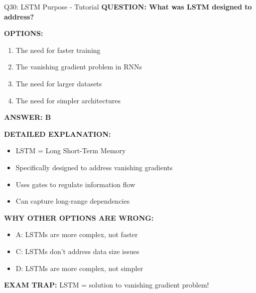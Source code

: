 \documentclass[8pt]{beamer}
\begin{document}
	\begin{frame}{Q30: LSTM Purpose - Tutorial}
		\fontsize{6.5}{7.5}\selectfont
		\textbf{QUESTION: What was LSTM designed to address?}
		
		\vspace{0.1cm}
		\textbf{OPTIONS:}
		\begin{enumerate}
			\item The need for faster training
			\item The vanishing gradient problem in RNNs
			\item The need for larger datasets
			\item The need for simpler architectures
		\end{enumerate}
		
		\vspace{0.1cm}
		\textcolor{myblue}{\textbf{ANSWER: B}}
		
		\vspace{0.1cm}
		\textbf{DETAILED EXPLANATION:}
		\begin{itemize}
			\item LSTM = Long Short-Term Memory
			\item Specifically designed to address vanishing gradients
			\item Uses gates to regulate information flow
			\item Can capture long-range dependencies
		\end{itemize}
		
		\vspace{0.1cm}
		\textcolor{myred}{\textbf{WHY OTHER OPTIONS ARE WRONG:}}
		\begin{itemize}
			\item \textcolor{myred}{A:} LSTMs are more complex, not faster
			\item \textcolor{myred}{C:} LSTMs don't address data size issues
			\item \textcolor{myred}{D:} LSTMs are more complex, not simpler
		\end{itemize}
		
		\textcolor{myred}{\textbf{EXAM TRAP:}} LSTM = \textcolor{myblue}{solution to vanishing gradient} problem!
	\end{frame}
	
\end{document}
